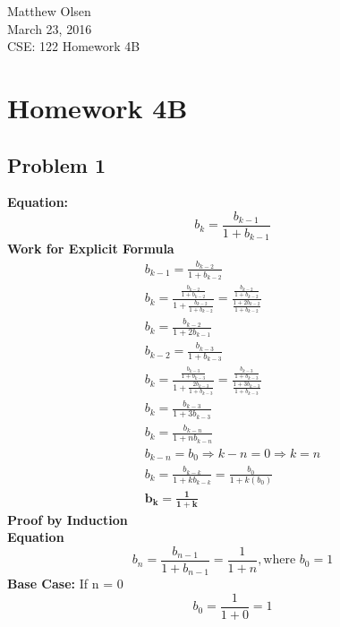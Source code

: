 \documentclass[a4paper,11pt]{article}
\begin{document}
\begin{flushright}
Matthew Olsen\\
March 23, 2016\\ 
CSE: 122 Homework 4B\\
\end{flushright}

\section{Homework 4B}
	\subsection{Problem 1}
	\textbf{Equation:}\\
	\begin{equation*}
		b_k = \frac{b_{k-1}}{1+b_{k-1}}
	\end{equation*}
	\textbf{Work for Explicit Formula}\\
	\begin{gather*}
		b_{k-1} = \frac{b_{k-2}}{1+b_{k-2}}\\
		b_k = \frac{\frac{b_{k-2}}{1+b_{k-2}}}{1 + \frac{b_{k-2}}{1+b_{k-2}}} = \frac{\frac{b_{k-2}}{1+b_{k-2}}}{\frac{1+2b_{k-2}}{1+b_{k-2}}}\\
		b_k = \frac{b_{k-2}}{1+2b_{k-1}}\\
		b_{k-2} = \frac{b_{k-3}}{1+b_{k-3}}\\
		b_k = \frac{\frac{b_{k-3}}{1+b_{k-3}}}{1 + \frac{2b_{k-3}}{1+b_{k-3}}} = \frac{\frac{b_{k-3}}{1+b_{k-3}}}{\frac{1+3b_{k-3}}{1+b_{k-3}}}\\
		b_k = \frac{b_{k-3}}{1+3b_{k-3}}\\
		b_k = \frac{b_{k-n}}{1+nb_{k-n}}\\
		b_{k-n}=b_{0} \Rightarrow k-n=0 \Rightarrow k=n\\
		b_k = \frac{b_{k-k}}{1+kb_{k-k}} = \frac{b_0}{1+k(b_0)}\\
		\mathbf{b_k=\frac{1}{1+k}}
	\end{gather*}
	\textbf{Proof by Induction}\\
	\textbf{Equation}\\
	\begin{equation*}
		b_n=\frac{b_{n-1}}{1+b_{n-1}}=\frac{1}{1+n}, \text{where $b_0 = 1$}
	\end{equation*}
	\textbf{Base Case:} If n = 0\\
	\begin{equation*}
		b_0=\frac{1}{1+0}=1
	\end{equation*}
\end{document}
